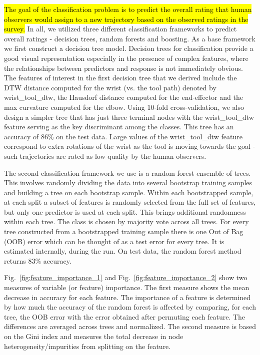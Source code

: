 \documentclass[letterpaper, 10 pt, conference]{ieeeconf}  %
\begin{document}
\hl{The goal of the classification problem is to predict the overall rating that human observers would assign to a new trajectory based on the observed ratings in the survey.} In all, we utilized three different classification frameworks to predict overall ratings - decision trees, random forests and boosting. As a base framework we first construct a decision tree model.  Decision trees for classification provide a good visual representation especially in the presence of complex features, where the relationships between predictors and response is not immediately obvious. The features of interest in the first decision tree that we derived include the DTW distance computed for the wrist (vs. the tool path) denoted by wrist\_tool\_dtw, the Hausdorf distance computed for the end-effector and the max curvature computed for the elbow. Using 10-fold cross-validation, we also design a simpler tree that has just three terminal nodes with the wrist\_tool\_dtw feature serving as the key discriminant among the classes. This tree has an accuracy of 86\% on the test data. Large values of the wrist\_tool\_dtw feature correspond to extra rotations of the wrist as the tool is moving towards the goal - such trajectories are rated as low quality by the human observers. 

The second classification framework we use is a random forest ensemble of trees. This involves randomly dividing the data into several bootstrap training samples and building a tree on each bootstrap sample. Within each bootstrapped sample, at each split a subset of features is randomly selected from the full set of features, but only one predictor is used at each split. This brings additional randomness within each tree. The class is chosen by majority vote across all trees. For every tree constructed from a bootstrapped training sample there is one Out of Bag (OOB) error which can be thought of as a test error for every tree. It is estimated internally, during the run. On test data, the random forest method returns 83\% accuracy. 

Fig.~\ref{fig:feature_importance_1} and Fig.~\ref{fig:feature_importance_2} show two measures of variable (or feature) importance. The first measure shows the mean decrease in accuracy for each feature. The importance of a feature is determined by how much the accuracy of the random forest is affected by comparing, for each tree, the OOB error with the error obtained after permuting each feature. The differences are averaged across trees and normalized.  The second measure is based on the Gini index and measures the total decrease in node heterogeneity/impurities from splitting on the feature.  
\end{document}
